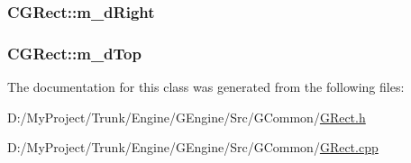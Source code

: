 \subsubsection[{m\+\_\+d\+Right}]{ C\+G\+Rect\+::m\+\_\+d\+Right\hspace{0.3cm}{\ttfamily [protected]}}\label{class_c_g_rect_a1459c3625fb2bc8ab26f5cf7b2f61f2f}
\hypertarget{class_c_g_rect_ab275b94322ca9375b3e67d43c50102e1}{}
\subsubsection[{m\+\_\+d\+Top}]{ C\+G\+Rect\+::m\+\_\+d\+Top\hspace{0.3cm}{\ttfamily [protected]}}\label{class_c_g_rect_ab275b94322ca9375b3e67d43c50102e1}


The documentation for this class was generated from the following files\+:\begin{DoxyCompactItemize}
\item 
D\+:/\+My\+Project/\+Trunk/\+Engine/\+G\+Engine/\+Src/\+G\+Common/\hyperlink{_g_rect_8h}{G\+Rect.\+h}\item 
D\+:/\+My\+Project/\+Trunk/\+Engine/\+G\+Engine/\+Src/\+G\+Common/\hyperlink{_g_rect_8cpp}{G\+Rect.\+cpp}\end{DoxyCompactItemize}
